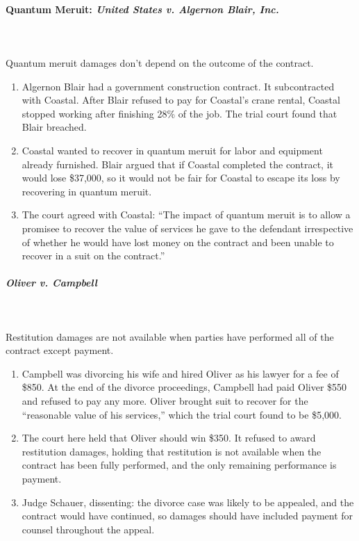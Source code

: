 \paragraph{Quantum Meruit: \emph{United States v. Algernon Blair, Inc.}}
~\\\\
Quantum meruit damages don't depend on the outcome of the contract.

\begin{enumerate}
    \item Algernon Blair had a government construction contract. It subcontracted 
    with Coastal. After Blair refused to pay for Coastal's crane rental, 
    Coastal stopped working after finishing 28\% of the job. The trial court 
    found that Blair breached.
    \item Coastal wanted to recover in quantum meruit for labor and equipment 
    already furnished. Blair argued that if Coastal completed the contract, it 
    would lose \$37,000, so it would not be fair for Coastal to escape its 
    loss by recovering in quantum meruit.
    \item The court agreed with Coastal: ``The impact of quantum meruit is to 
    allow a promisee to recover the value of services he gave to the defendant 
    irrespective of whether he would have lost money on the contract and been 
    unable to recover in a suit on the contract.''
\end{enumerate}

\paragraph{\emph{Oliver v. Campbell}}
~\\\\
Restitution damages are not available when parties have performed all of the 
contract except payment.

\begin{enumerate}
    \item Campbell was divorcing his wife and hired Oliver as his lawyer for a 
    fee of \$850. At the end of the divorce proceedings, Campbell had paid 
    Oliver \$550 and refused to pay any more. Oliver brought suit to recover 
    for the ``reasonable value of his services,'' which the trial court found 
    to be \$5,000. 
    \item The court here held that Oliver should win \$350. It refused to 
    award restitution damages, holding that restitution is not available when 
    the contract has been fully performed, and the only remaining performance 
    is payment.
    \item Judge Schauer, dissenting: the divorce case was likely to be 
    appealed, and the contract would have continued, so damages should have 
    included payment for counsel throughout the appeal.
\end{enumerate}

